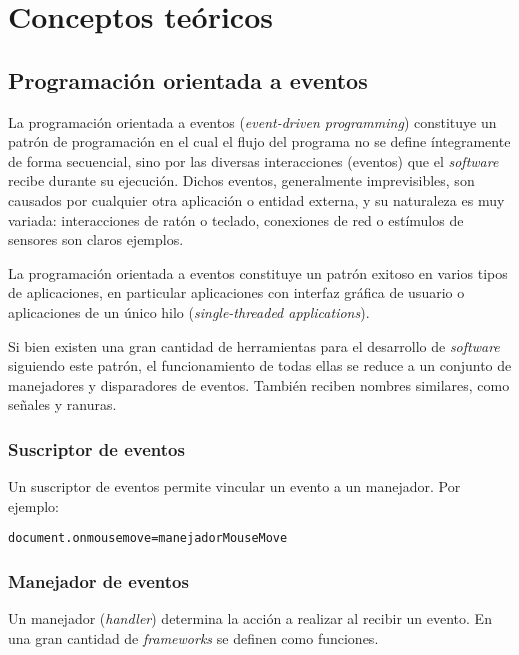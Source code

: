 
\chapter{Conceptos teóricos}

\section{Programación orientada a eventos}
\label{eventdriven}

La programación orientada a eventos (\textit{event-driven programming}) constituye un patrón de programación en el cual el flujo del programa no se define íntegramente de forma secuencial, sino por las diversas interacciones (eventos) que el \textit{software} recibe durante su ejecución. Dichos eventos, generalmente imprevisibles, son causados por cualquier otra aplicación o entidad externa, y su naturaleza es muy variada: interacciones de ratón o teclado, conexiones de red o estímulos de sensores son claros ejemplos.

La programación orientada a eventos constituye un patrón exitoso en varios tipos de aplicaciones, en particular aplicaciones con interfaz gráfica de usuario o aplicaciones de un único hilo (\textit{single-threaded applications}). 

Si bien existen una gran cantidad de herramientas para el desarrollo de \textit{software} siguiendo este patrón, el funcionamiento de todas ellas se reduce a un conjunto de manejadores y disparadores de eventos. También reciben nombres similares, como señales y ranuras.

\subsection{Suscriptor de eventos}

Un suscriptor de eventos permite vincular un evento a un manejador. Por ejemplo:

\begin{lstlisting}
document.onmousemove=manejadorMouseMove
\end{lstlisting}

\subsection{Manejador de eventos}

Un manejador (\textit{handler}) determina la acción a realizar al recibir un evento. En una gran cantidad de \textit{frameworks} se definen como funciones.

